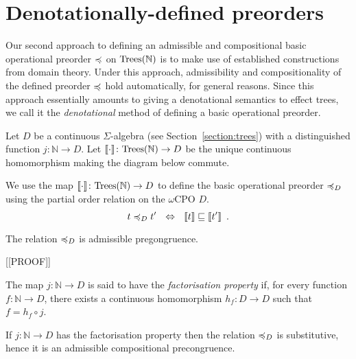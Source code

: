 \section{Denotationally-defined preorders}

Our second approach to defining an admissible and compositional basic operational
preorder $\preccurlyeq$ on $\textnormal{Trees}(\mathbb{N})$ is to make use of established constructions from domain theory.
Under this approach, admissibility and compositionality of the defined preorder $\preccurlyeq$ hold automatically,
for general reasons. Since this approach essentially amounts to giving a denotational semantics to effect trees, we call it the 
\emph{denotational} method of defining a basic operational preorder.

Let $D$ be a continuous $\Sigma$-algebra (see Section~\ref{section:trees}) with a distinguished function 
$j\colon \mathbb{N} \to D$. Let   $\llbracket \cdot \rrbracket \colon \textnormal{Trees}(\mathbb{N}) \to D$ be the unique continuous homomorphism
making the diagram below commute.
   \begin{center}
    \end{center}
\noindent
We use the map $\llbracket \cdot \rrbracket \colon \textnormal{Trees}(\mathbb{N}) \to D$ to define 
the basic operational preorder $\preccurlyeq_D$ using the partial order relation on the $\omega$CPO $D$.
\[
t \preccurlyeq_D t' ~~ \Leftrightarrow ~~ \llbracket t \rrbracket \sqsubseteq \llbracket t'  \rrbracket \enspace .
\]
\begin{proposition}
The relation $\preccurlyeq_D$ is admissible pregongruence.
\end{proposition}

[[PROOF]]

\begin{definition}
    The map $j\colon \mathbb{N} \to D$ is said to have  the \emph{factorisation property} if,
    for every function $f \colon \mathbb{N} \to D$, there exists a 
    continuous homomorphism $h_f : D \to D$ such that $f = h_f \circ j$.
    \begin{center}
    \end{center}
\end{definition}
\begin{proposition}
If $j\colon \mathbb{N} \to D$ has the factorisation property then 
the relation $\preccurlyeq_D$ is substitutive, hence it is an admissible compositional precongruence.
\end{proposition}


